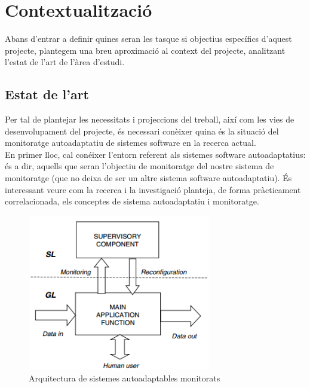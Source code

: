 \chapter{Contextualització}

\label{Contextualitzacio}

Abans d'entrar a definir quines seran les tasque si objectius específics d'aquest projecte, plantegem una breu aproximació al context del projecte, analitzant l'estat de l'art de l'àrea d'estudi.


\section{Estat de l'art}

Per tal de plantejar les necessitats i projeccions del treball, així com les vies de desenvolupament del projecte, és necessari conèixer quina és la situació del monitoratge autoadaptatiu de sistemes software en la recerca actual.\\

En primer lloc, cal conéixer l’entorn referent als sistemes software autoadaptatius: és a dir, aquells que seran l’objectiu de monitoratge del nostre sistema de monitoratge (que no deixa de ser un altre sistema software autoadaptatiu). És interessant veure com la recerca i la investigació planteja, de forma pràcticament correlacionada, els conceptes de sistema autoadaptatiu i monitoratge.\\

\begin{figure}
\centering
\includegraphics[width=8cm]{Figures/Figure1}
\decoRule
\caption[Arquitectura de sistemes auotadaptables monitorats]{Arquitectura de sistemes autoadaptables monitorats}
\label{fig:Figura1}
\end{figure}

